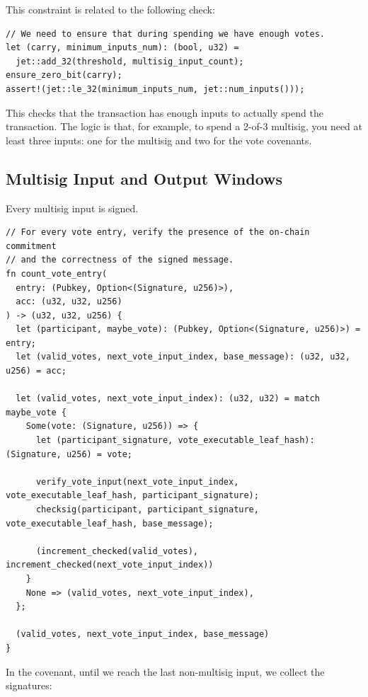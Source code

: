 \documentclass[11pt]{article}
\begin{document}
This constraint is related to the following check:

\begin{lstlisting}
// We need to ensure that during spending we have enough votes.
let (carry, minimum_inputs_num): (bool, u32) =
  jet::add_32(threshold, multisig_input_count);
ensure_zero_bit(carry);
assert!(jet::le_32(minimum_inputs_num, jet::num_inputs()));
\end{lstlisting}

This checks that the transaction has enough inputs to actually spend the transaction.
The logic is that, for example, to spend a 2-of-3 multisig, you need at least three inputs: one for the multisig and two for the vote covenants.

\subsection{Multisig Input and Output Windows}

Every multisig input is signed.

\begin{lstlisting}
// For every vote entry, verify the presence of the on-chain commitment
// and the correctness of the signed message.
fn count_vote_entry(
  entry: (Pubkey, Option<(Signature, u256)>),
  acc: (u32, u32, u256)
) -> (u32, u32, u256) {
  let (participant, maybe_vote): (Pubkey, Option<(Signature, u256)>) = entry;
  let (valid_votes, next_vote_input_index, base_message): (u32, u32, u256) = acc;

  let (valid_votes, next_vote_input_index): (u32, u32) = match maybe_vote {
    Some(vote: (Signature, u256)) => {
      let (participant_signature, vote_executable_leaf_hash): (Signature, u256) = vote;

      verify_vote_input(next_vote_input_index, vote_executable_leaf_hash, participant_signature);
      checksig(participant, participant_signature, vote_executable_leaf_hash, base_message);

      (increment_checked(valid_votes), increment_checked(next_vote_input_index))
    }
    None => (valid_votes, next_vote_input_index),
  };

  (valid_votes, next_vote_input_index, base_message)
}
\end{lstlisting}

In the covenant, until we reach the last non-multisig input, we collect the signatures:
\end{document}
